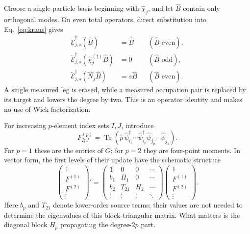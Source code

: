 \documentclass[aps,prb,onecolumn,nofootinbib,superscriptaddress,floatfix]{revtex4-2}
\newcommand{\Tr}{\operatorname{Tr}}
\newcommand{\E}{\widetilde{\mathcal E}}
\begin{document}
Choose a single-particle basis beginning with $\hat\chi_j$, and
let $\hat B$ contain only orthogonal modes. On even total operators,
direct substitution into Eq.~\eqref{eq:kraus} gives
\begin{align}
 \E_{j,s}^\dagger(\hat B)&=\hat B
       &&(\hat B\text{ even}),\nonumber\\
 \E_{j,s}^\dagger(\hat\chi_j^{(\dagger)}\hat B)&=0
       &&(\hat B\text{ odd}),\nonumber\\
 \E_{j,s}^\dagger(\hat N_j\hat B)&=s\hat B
       &&(\hat B\text{ even}). \label{eq:localrule}
\end{align}
A single measured leg is erased, while a measured occupation pair
is replaced by its target and lowers the degree by two. This is an
operator identity and makes no use of Wick factorization.

For increasing $p$-element index sets $I,J$, introduce
\begin{equation}
 F_{I;J}^{(p)}=\Tr\!\left(\hat\rho\,
 \hat\psi_{i_1}^\dagger\cdots\hat\psi_{i_p}^\dagger
 \hat\psi_{j_p}\cdots\hat\psi_{j_1}\right).
 \label{eq:moments}
\end{equation}
For $p=1$ these are the entries of $\overline G$; for $p=2$ they are
four-point moments. In vector form, the first levels of their
update have the schematic structure
\begin{equation}
 \begin{pmatrix}1\\F^{(1)}\\F^{(2)}\\\vdots\end{pmatrix}'=
 \begin{pmatrix}
  1&0&0&\cdots\\
  b_1&H_1&0&\cdots\\
  b_2&T_{21}&H_2&\cdots\\
  \vdots&\vdots&\vdots&\ddots
 \end{pmatrix}
 \begin{pmatrix}1\\F^{(1)}\\F^{(2)}\\\vdots\end{pmatrix}.
 \label{eq:triangular_example}
\end{equation}
Here $b_p$ and $T_{21}$ denote lower-order source terms; their
values are not needed to determine the eigenvalues of this
block-triangular matrix. What matters is the diagonal block $H_p$
propagating the degree-$2p$ part.
\end{document}
